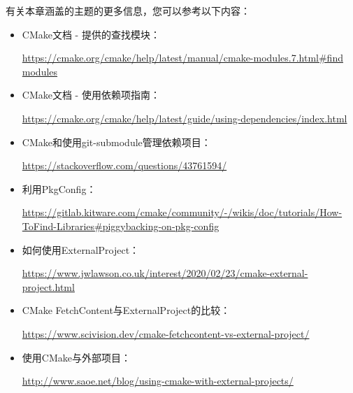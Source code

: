 有关本章涵盖的主题的更多信息，您可以参考以下内容：

\begin{itemize}
\item
CMake文档 - 提供的查找模块：

\url{https://cmake.org/cmake/help/latest/manual/cmake-modules.7.html#find modules}

\item
CMake文档 - 使用依赖项指南：

\url{https://cmake.org/cmake/help/latest/guide/using-dependencies/index.html}

\item
CMake和使用git-submodule管理依赖项目：

\url{https://stackoverflow.com/questions/43761594/}

\item
利用PkgConfig：

\url{https://gitlab.kitware.com/cmake/community/-/wikis/doc/tutorials/How-ToFind-Libraries#piggybacking-on-pkg-config}

\item
如何使用ExternalProject：

\url{https://www.jwlawson.co.uk/interest/2020/02/23/cmake-external-project.html}

\item
CMake FetchContent与ExternalProject的比较：

\url{https://www.scivision.dev/cmake-fetchcontent-vs-external-project/}

\item
使用CMake与外部项目：

\url{http://www.saoe.net/blog/using-cmake-with-external-projects/}
\end{itemize}

















